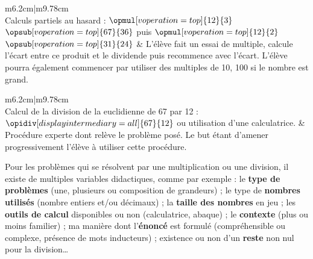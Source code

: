 {\renewcommand{\arraystretch}{1.5}{
   \begin{Ltableau}{1\linewidth}{2}{m{6.2cm}|m{9.78cm}}
      \hline
          \\
      \hline   
     Calculs partiels \og au hasard \fg{} : \newline
     \hspace*{1.5cm} $\opmul[voperation=top]{12}{3}$ \qquad $\opsub[voperation=top]{67}{36}$ \newline \newline
      puis \newline
      \hspace*{1.5cm} $\opmul[voperation=top]{12}{2}$ \qquad $\opsub[voperation=top]{31}{24}$ \newline
     &
     L'élève fait un essai de multiple, calcule l'écart entre ce produit et le dividende puis recommence avec l'écart. \newline
    L'élève pourra également commencer par utiliser des multiples de 10, 100 si le nombre est grand. \\
    \hline
    \end{Ltableau}}}

\bigskip
    
{\renewcommand{\arraystretch}{1.5}{
   \begin{Ltableau}{1\linewidth}{2}{m{6.2cm}|m{9.78cm}}
      \hline
          \\
      \hline
      Calcul de la division de la euclidienne de 67 par 12 : \newline
      \hspace*{2cm} $\opidiv[displayintermediary=all]{67}{12}$ \newline
      ou \newline      
      utilisation d'une calculatrice.
      &
      Procédure experte dont relève le problème posé. Le but étant d'amener progressivement l'élève à utiliser cette procédure. \\
      \hline
   \end{Ltableau}}}

\bigskip

Pour les problèmes qui se résolvent par une multiplication ou une division, il existe de multiples variables didactiques, comme par exemple : le {\bf type de problèmes} (une, plusieurs ou composition de grandeurs) ; le type de {\bf nombres utilisés} (nombre entiers et/ou décimaux) ; la {\bf taille des nombres} en jeu ; les {\bf outils de calcul} disponibles ou non (calculatrice, abaque) ; le {\bf contexte} (plus ou moins familier) ; ma manière dont l'{\bf énoncé} est formulé (compréhensible ou complexe, présence de mots inducteurs) ; existence ou non d'un {\bf reste} non nul pour la division\dots


